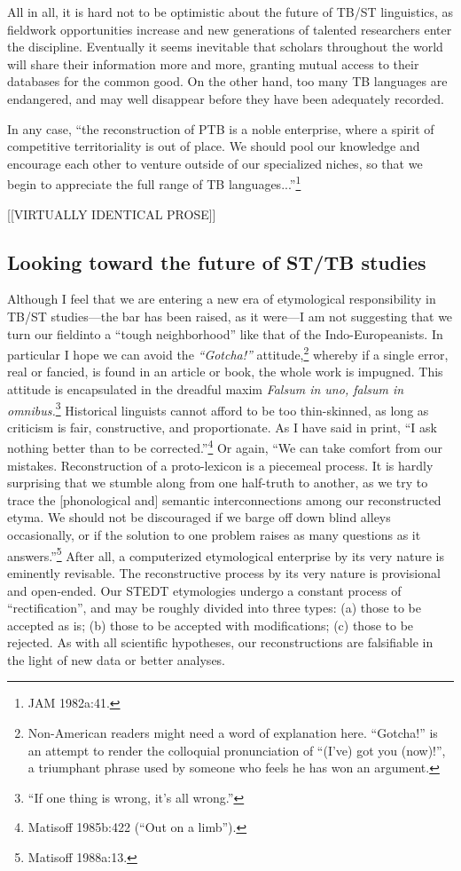 All in all, it is hard not to be optimistic about the future of TB/ST linguistics, as fieldwork opportunities increase and new generations of talented researchers enter the discipline. Eventually it seems inevitable that scholars throughout the world will share their information more and more, granting mutual access to their databases for the common good. On the other hand, too many TB languages are endangered, and may well disappear before they have been adequately recorded.

In any case, ``the reconstruction of PTB is a noble enterprise, where a spirit of competitive territoriality is out of place. We should pool our knowledge and encourage each other to venture outside of our specialized niches, so that we begin to appreciate the full range of TB languages...''\footnote{JAM 1982a:41.}

[[VIRTUALLY IDENTICAL PROSE]]

\subsection{Looking toward the future of ST/TB studies}


Although I feel that we are entering a new era of etymological
responsibility in TB/ST studies—the bar has been raised, as it were—I am
not suggesting that we turn our fieldinto a “tough neighborhood” like that of
the Indo-Europeanists. In particular I hope we can avoid the \textit{“Gotcha!”}
attitude,\footnote{Non-American readers might need a word of explanation here. 
“Gotcha!” is an attempt to render the colloquial pronunciation of “(I’ve) got
you (now)!”, a triumphant phrase used by someone who feels he has won an
argument.} whereby if a single error, real or fancied, is found in an article or
book, the whole work is impugned. This attitude is encapsulated in the dreadful
maxim \textit{Falsum in uno, falsum in omnibus.}\footnote{“If one thing is wrong, it’s
all wrong.”} Historical linguists cannot afford to be too thin-skinned, as long
as criticism is fair, constructive, and proportionate. As I have said in print,
“I ask nothing better than to be corrected.”\footnote{Matisoff 1985b:422 (“Out
on a limb”).}  Or again, “We can take comfort from our mistakes. Reconstruction
of a proto-lexicon is a piecemeal process. It is hardly surprising that we
stumble along from one half-truth to another, as we try to trace the
[phonological and] semantic interconnections among our reconstructed etyma. We
should not be discouraged if we barge off down blind alleys occasionally, or if
the solution to one problem raises as many questions as it answers.”\footnote{Matisoff 1988a:13.} After all, a computerized etymological enterprise by its
very nature is eminently revisable.  The reconstructive process by its very
nature is provisional and open-ended.  Our STEDT etymologies undergo a constant
process of “rectification”, and may be roughly divided into three types: (a)
those to be accepted as is; (b) those to be accepted with modifications; (c)
those to be rejected.  As with all scientific hypotheses, our reconstructions
are falsifiable in the light of new data or better analyses.


